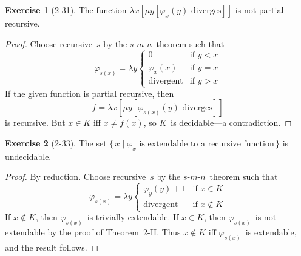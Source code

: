 \documentclass[letterpaper]{article}
\newcommand{\smn}{$s$-$m$-$n$}
\theoremstyle{definition}
\newtheorem*{exer}{Exercise}
\theoremstyle{remark}
\theoremstyle{direction}
\begin{document}
\begin{exer}[2-31]
The function $\lambda x[\mu y[\varphi_x(y)\text{ diverges}]]$ is not partial recursive.
\end{exer}
\begin{proof}
Choose recursive~$s$ by the \smn\ theorem such that
$$\varphi_{s(x)}=\lambda y\begin{cases}
0&\text{if }y<x\\
\varphi_x(x)&\text{if }y=x\\
\text{divergent}&\text{if }y>x
\end{cases}$$
If the given function is partial recursive, then
$$f=\lambda x[\mu y[\varphi_{s(x)}(y)\text{ diverges}]]$$
is recursive. But $x\in K$ iff $x\ne f(x)$, so $K$~is decidable---a contradiction.
\end{proof}

\begin{exer}[2-33]
The set $\{\,x\mid\varphi_x\text{ is extendable to a recursive function}\,\}$ is undecidable.
\end{exer}
\begin{proof}
By reduction. Choose recursive~$s$ by the \smn\ theorem such that
$$\varphi_{s(x)}=\lambda y\begin{cases}
\varphi_y(y)+1&\text{if }x\in K\\
\text{divergent}&\text{if }x\not\in K
\end{cases}$$
If $x\not\in K$, then $\varphi_{s(x)}$~is trivially extendable. If $x\in K$, then $\varphi_{s(x)}$~is not extendable by the proof of Theorem~2-II. Thus $x\not\in K$ iff $\varphi_{s(x)}$~is extendable, and the result follows.
\end{proof}
\end{document}
